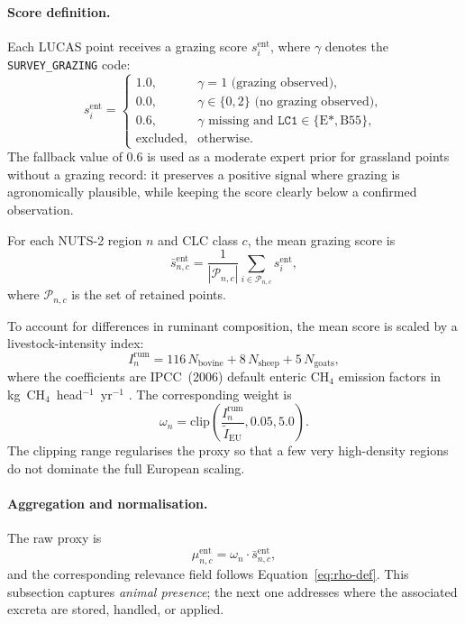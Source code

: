 \paragraph{Score definition.}
Each LUCAS point receives a grazing score
$s_i^{\mathrm{ent}}$, where $\gamma$ denotes the
\texttt{SURVEY\_GRAZING} code:
\begin{equation}
  s_i^{\mathrm{ent}} =
  \begin{cases}
    1.0, & \gamma = 1 \text{ (grazing observed)},\\[3pt]
    0.0, & \gamma \in \{0,2\} \text{ (no grazing observed)},\\[3pt]
    0.6, & \gamma \text{ missing and } \texttt{LC1} \in \{\text{E*},\text{B55}\},\\[3pt]
    \text{excluded}, & \text{otherwise}.
  \end{cases}
\end{equation}
The fallback value of 0.6 is used as a moderate expert prior for
grassland points without a grazing record: it preserves a positive
signal where grazing is agronomically plausible, while keeping the
score clearly below a confirmed observation.

For each NUTS-2 region $n$ and CLC class $c$, the mean grazing score is
\begin{equation}
  \bar{s}_{n,c}^{\mathrm{ent}} =
  \frac{1}{|\mathcal{P}_{n,c}|}
  \sum_{i \in \mathcal{P}_{n,c}} s_i^{\mathrm{ent}},
\end{equation}
where $\mathcal{P}_{n,c}$ is the set of retained points.

To account for differences in ruminant composition, the mean score is
scaled by a livestock-intensity index:
\begin{equation}
  I_n^{\mathrm{rum}} =
  116\,N_{\mathrm{bovine}} + 8\,N_{\mathrm{sheep}} + 5\,N_{\mathrm{goats}},
\end{equation}
where the coefficients are IPCC~(2006) default enteric CH$_4$
emission factors in kg~CH$_4$~head$^{-1}$~yr$^{-1}$
\citep{IPPC_2006_V10}. The corresponding weight is
\begin{equation}
  \omega_n =
  \mathrm{clip}\!\left(
    \frac{I_n^{\mathrm{rum}}}{\tilde{I}_{\mathrm{EU}}},
    0.05, 5.0
  \right).
\end{equation}
The clipping range regularises the proxy so that a few very high-density
regions do not dominate the full European scaling.

\paragraph{Aggregation and normalisation.}
The raw proxy is
\begin{equation}
  \mu_{n,c}^{\mathrm{ent}} =
  \omega_n \cdot \bar{s}_{n,c}^{\mathrm{ent}},
\end{equation}
and the corresponding relevance field follows
Equation~\ref{eq:rho-def}. This subsection captures \emph{animal
presence}; the next one addresses where the associated excreta are
stored, handled, or applied.

